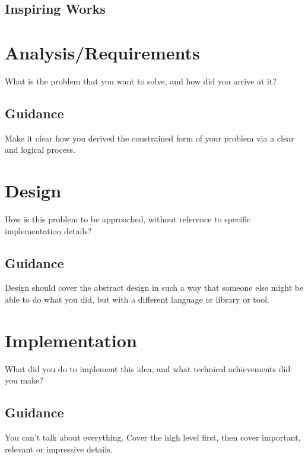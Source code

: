 \documentclass{l4proj}
\begin{document}
\section{Inspiring Works}
\begin{itemize}

\end{itemize}

\chapter{Analysis/Requirements}
What is the problem that you want to solve, and how did you arrive at it?
\section{Guidance}
Make it clear how you derived the constrained form of your problem via a clear and logical process.

\chapter{Design}
How is this problem to be approached, without reference to specific implementation details?
\section{Guidance}
Design should cover the abstract design in such a way that someone else might be able to do what you did, but with a different language or library or tool.

\chapter{Implementation}
What did you do to implement this idea, and what technical achievements did you make?
\section{Guidance}
You can't talk about everything. Cover the high level first, then cover important, relevant or impressive details.
\end{document}
